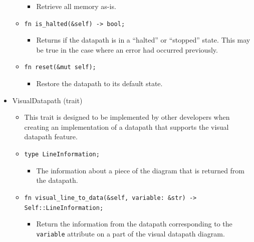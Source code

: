 \documentclass[
    paper=letter,
    parskip=half,
    fontsize=12pt,
    titlepage=firstiscover,
    toc=bibliography,
    numbers=endperiod
]{scrartcl}
\providecommand{\tightlist}{%
  \setlength{\itemsep}{0pt}\setlength{\parskip}{0pt}}
\begin{document}
\begin{itemize}
\begin{itemize}
                    \begin{itemize}
                        \tightlist
                        \item Retrieve all memory as-is.
                    \end{itemize}
              \item \texttt{fn is\_halted(\&self) -\textgreater{} bool;}
                    \begin{itemize}
                        \tightlist
                        \item Returns if the datapath is in a ``halted'' or ``stopped'' state. This may be
                              true in the case where an error had occurred previously.
                    \end{itemize}
              \item \texttt{fn reset(\&mut self);}
                    \begin{itemize}
                        \tightlist
                        \item Restore the datapath to its default state.
                    \end{itemize}
          \end{itemize}

    \item VisualDatapath (trait)
          \begin{itemize}
              \tightlist
              \item This trait is designed to be implemented by other developers when
                    creating an implementation of a datapath that supports the visual
                    datapath feature.
              \item \texttt{type LineInformation;}
                    \begin{itemize}
                        \tightlist
                        \item The information about a piece of the diagram that is returned from the
                              datapath.
                    \end{itemize}
              \item \texttt{fn visual\_line\_to\_data(\&self, variable: \&str) -\textgreater{} Self::LineInformation;}
                    \begin{itemize}
                        \tightlist
                        \item Return the information from the datapath corresponding to the
                              \texttt{variable} attribute on a part of the visual datapath diagram.
                    \end{itemize}
          \end{itemize}


\end{itemize}
\end{document}
